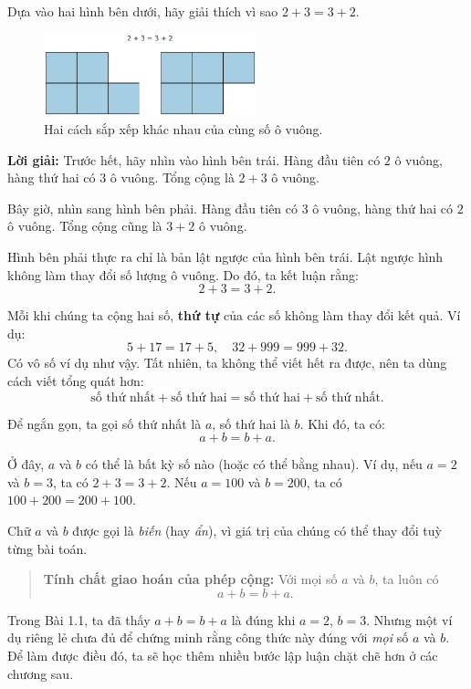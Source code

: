 \begin{problem}[1.1]
Dựa vào hai hình bên dưới, hãy giải thích vì sao $2 + 3 = 3 + 2$.

\begin{figure}[ht!]
  \centering
  \includegraphics[width=0.55\textwidth]{img/fig-prob1.1.pdf}
  \caption*{\small Hai cách sắp xếp khác nhau của cùng số ô vuông.}
\end{figure}

\textbf{Lời giải:}  
Trước hết, hãy nhìn vào hình bên trái. Hàng đầu tiên có $2$ ô vuông, hàng thứ hai có $3$ ô vuông.  
Tổng cộng là $2 + 3$ ô vuông.  

Bây giờ, nhìn sang hình bên phải. Hàng đầu tiên có $3$ ô vuông, hàng thứ hai có $2$ ô vuông.  
Tổng cộng cũng là $3 + 2$ ô vuông.  

Hình bên phải thực ra chỉ là bản lật ngược của hình bên trái.  
Lật ngược hình không làm thay đổi số lượng ô vuông.  
Do đó, ta kết luận rằng:
\[
2 + 3 = 3 + 2.
\]
\end{problem}

Mỗi khi chúng ta cộng hai số, \textbf{thứ tự} của các số không làm thay đổi kết quả.  
Ví dụ:
\[
5 + 17 = 17 + 5, \quad 32 + 999 = 999 + 32.
\]
Có vô số ví dụ như vậy.  
Tất nhiên, ta không thể viết hết ra được, nên ta dùng cách viết tổng quát hơn:
\[
\text{số thứ nhất} + \text{số thứ hai} = \text{số thứ hai} + \text{số thứ nhất.}
\]

Để ngắn gọn, ta gọi số thứ nhất là $a$, số thứ hai là $b$.  
Khi đó, ta có:
\[
a + b = b + a.
\]

Ở đây, $a$ và $b$ có thể là bất kỳ số nào (hoặc có thể bằng nhau).  
Ví dụ, nếu $a = 2$ và $b = 3$, ta có $2 + 3 = 3 + 2$.  
Nếu $a = 100$ và $b = 200$, ta có $100 + 200 = 200 + 100$.  

Chữ $a$ và $b$ được gọi là \emph{biến} (hay \emph{ẩn}), vì giá trị của chúng có thể thay đổi tuỳ từng bài toán.

\begin{quote}
\textbf{Tính chất giao hoán của phép cộng:}  
Với mọi số $a$ và $b$, ta luôn có
\[
a + b = b + a.
\]
\end{quote}

Trong Bài 1.1, ta đã thấy $a + b = b + a$ là đúng khi $a = 2$, $b = 3$.  
Nhưng một ví dụ riêng lẻ chưa đủ để chứng minh rằng công thức này đúng với \emph{mọi} số $a$ và $b$.  
Để làm được điều đó, ta sẽ học thêm nhiều bước lập luận chặt chẽ hơn ở các chương sau.

